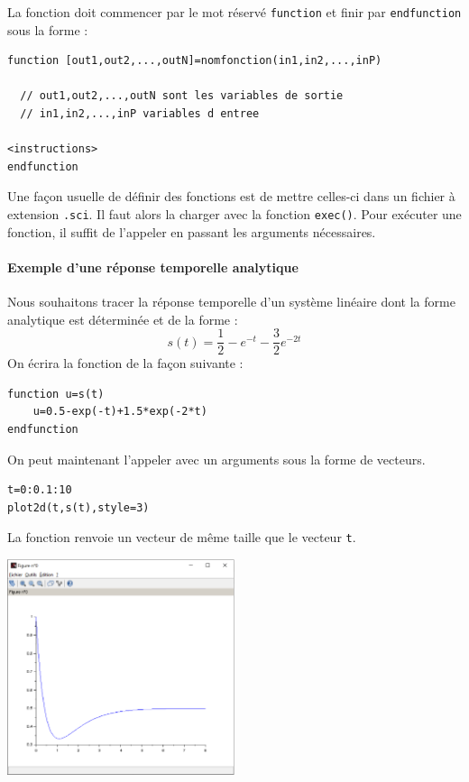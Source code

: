 La fonction doit commencer par le mot réservé \verb?function? et finir par 
\verb?endfunction? sous la forme :
\begin{code}
\begin{verbatim}
function [out1,out2,...,outN]=nomfonction(in1,in2,...,inP)

  // out1,out2,...,outN sont les variables de sortie
  // in1,in2,...,inP variables d entree
          
<instructions>
endfunction
\end{verbatim}
\end{code}

Une façon usuelle de définir des fonctions est de mettre 
celles-ci dans un fichier à extension \verb?.sci?. 
Il faut alors la charger avec la fonction \verb?exec()?.
Pour exécuter une fonction, il suffit de l'appeler en passant les 
arguments nécessaires.

\paragraph{Exemple d'une réponse temporelle analytique}
Nous souhaitons tracer la réponse temporelle d'un système linéaire dont la
forme analytique est déterminée et de la forme :
$$
s(t)=\dfrac{1}{2}-e^{-t}-\dfrac{3}{2}e^{-2t}
$$
On écrira la fonction de la façon suivante :
\begin{code}
\begin{verbatim}
function u=s(t)
    u=0.5-exp(-t)+1.5*exp(-2*t)
endfunction
\end{verbatim}
\end{code}

On peut maintenant l'appeler avec un arguments sous la forme de vecteurs. 
\begin{code}
\begin{verbatim}
t=0:0.1:10
plot2d(t,s(t),style=3)
\end{verbatim}
\end{code}
La fonction renvoie un vecteur de même taille que le vecteur \verb?t?.

\begin{center}
    \includegraphics[width=0.5\textwidth]{fig/capture_SCILAB-fonction.eps}
\end{center}

